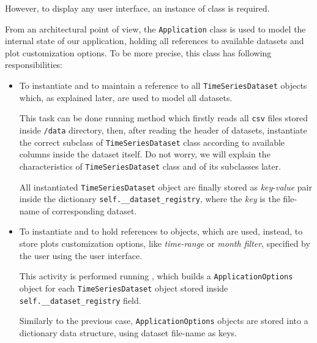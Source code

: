 \documentclass[sigconf]{acmart}
\begin{document}
However, to display any user interface, an instance of  class is required.

From an architectural point of view, the \texttt{Application} class is used to model the internal state of our application, holding all references to available datasets and  plot customization options. To be more precise, this class has following responsibilities: 

\begin{itemize}
\item To instantiate and to maintain a reference to all \texttt{TimeSeries\-Data\-set} objects which, as explained later, are used to model all datasets.

This task can be done running  method which firstly reads all \texttt{csv} files stored inside \texttt{/data} directory, then, after reading the header of datasets, instantiate the correct subclass of \texttt{TimeSeries\-Data\-set} class according to available columns inside the dataset itself. Do not worry, we will explain the characteristics of \texttt{TimeSeries\-Data\-set} class and of its subclasses later.

All instantiated \texttt{TimeSeries\-Data\-set} object are finally stored as \textit{key}-\textit{value} pair inside the dictionary \texttt{self.\_\_dataset\_registry}, where the \textit{key} is the file-name of corresponding dataset. 

\item To instantiate and to hold references to  objects, which are used, instead, to store plots customization options, like \textit{time-range} or \textit{month filter}, specified by the user using the user interface.

This activity is performed running , which builds a \texttt{ApplicationOptions} object for each \texttt{TimeSeries\-Data\-set} object stored inside \texttt{self.\_\_dataset\_registry} field.

Similarly to the previous case, \texttt{ApplicationOptions} objects are stored into a dictionary data structure, using dataset file-name as keys.

\end{itemize}
  
\end{document}
